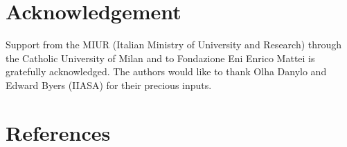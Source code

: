 \documentclass[preprint,12pt]{elsarticle}
\begin{document}
\section*{Acknowledgement}
Support from the MIUR (Italian Ministry of University and Research) through the Catholic University of Milan and to Fondazione Eni Enrico Mattei is gratefully acknowledged. The authors would like to thank Olha Danylo and Edward Byers (IIASA) for their precious inputs.

\section*{References}
\begin{footnotesize}

\end{footnotesize}
\end{document}
